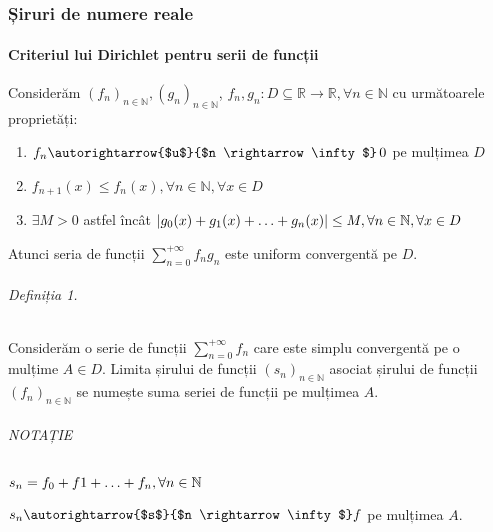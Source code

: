 \part{}
\section{Șiruri de numere reale}
\subsection{Criteriul lui Dirichlet pentru serii de funcții}
Considerăm $(f_{n})_{n \in \mathbb{N}}, (g_{n})_{n \in \mathbb{N}}$, $f_{n}, g_{n}: D \subseteq \mathbb{R} \rightarrow \mathbb{R}, \forall n \in \mathbb{N}$ cu următoarele proprietăți:
\begin{enumerate}[label=\emph{\alph*})]
	\item $f_{n} \autorightarrow{$u$}{$n \rightarrow \infty$} \, 0$ pe mulțimea $D$
	\item $f_{n+1}(x) \leq f_{n}(x), \forall n \in \mathbb{N}, \forall x \in D$
	\item $\exists M>0$ astfel încât $\lvert g_{0}(x) + g_{1}(x) + \mathellipsis + g_{n}(x) \rvert \leq M, \forall n \in \mathbb{N}, \forall x \in D$
\end{enumerate}
Atunci seria de funcții $\displaystyle\sum_{n=0}^{+\infty} f_{n} g_{n}$ este uniform convergentă pe $D$.

\paragraph*{Definiția 1.}
Considerăm o serie de funcții $\displaystyle\sum_{n=0}^{+\infty} f_{n}$ care este simplu convergentă pe o mulțime $A \in D$.
Limita șirului de funcții $(s_{n})_{n \in \mathbb{N}}$ asociat șirului de funcții $(f_{n})_{n \in \mathbb{N}}$ se numește suma seriei de funcții pe mulțimea $A$.

\paragraph{NOTAȚIE}
$s_{n} = f_{0} + f{1} + \mathellipsis + f_{n}, \forall n \in \mathbb{N}$

\vspace{5pt}
\hspace{49pt}$s_{n} \autorightarrow{$s$}{$n \rightarrow \infty$}f$ pe mulțimea $A$.

